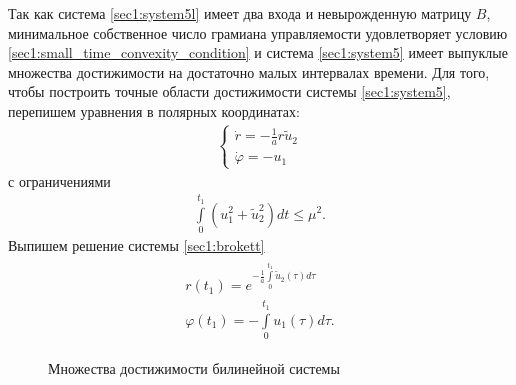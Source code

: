 \documentclass[../main.tex]{subfiles}
\begin{document}
Так как система \eqref{sec1:system5l} имеет два входа и невырожденную матрицу $ B $, минимальное собственное число грамиана управляемости удовлетворяет условию \eqref{sec1:small_time_convexity_condition} и система \eqref{sec1:system5} имеет выпуклые множества достижимости на достаточно малых интервалах времени. 
Для того, чтобы построить точные области достижимости системы  \eqref{sec1:system5}, перепишем уравнения в полярных координатах:
\begin{gather}\label{sec1:brokett}
     \left\{ {\begin{array}{*{20}{c}}
             {\dot r =  - \frac{1}{a}r{\tilde u_2}}\\
             {\dot \varphi  =  - {u_1}}
     \end{array}} \right.
\end{gather}
с ограничениями
\begin{gather*}
    \int \limits_0^{t_1} \left( u_1^2 + \tilde{u}_2^2\right) dt \leq \mu^2.
\end{gather*}
Выпишем решение системы \eqref{sec1:brokett}
\begin{gather*}
\begin{array}{l}
         r({t_1}) = {e^{ - \frac{1}{a}\int\limits_0^{{t_1}} {{{\tilde u}_2}} (\tau )d\tau }}\\
         \varphi ({t_1}) =  - \int\limits_0^{{t_1}} {{u_1}} (\tau )d\tau. 
\end{array}
\end{gather*}
\begin{figure}[h]
     \begin{minipage}[h]{0.5\linewidth}
     \end{minipage}
     \hfill
     \begin{minipage}[h]{0.5\linewidth}
     \end{minipage}
     \caption{Множества достижимости билинейной системы}
     \label{sec1:fig:fig31}
\end{figure}
 
\end{document}
